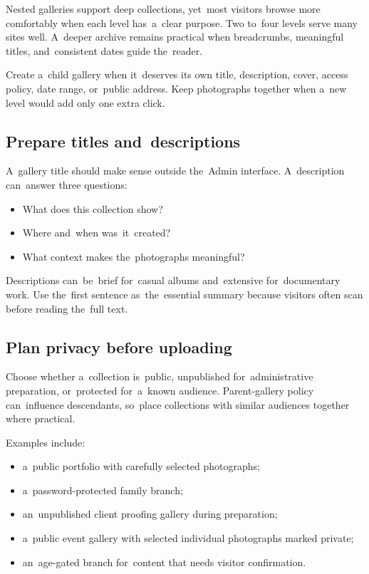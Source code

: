 \documentclass[11pt,a4paper]{article}
\begin{document}
Nested galleries support deep collections, yet~most visitors browse more
comfortably when each level has~a~clear purpose. Two to~four levels serve many
sites well. A~deeper archive remains practical when breadcrumbs, meaningful
titles, and~consistent dates guide the~reader.

Create a~child gallery when it~deserves its own title, description, cover,
access policy, date range, or~public address. Keep photographs together when
a~new level would add only one extra click.

\subsection{Prepare titles and~descriptions}

A~gallery title should make sense outside the~Admin interface. A~description
can~answer three questions:

\begin{itemize}
  \item What does this collection show?
  \item Where and~when was~it~created?
  \item What context makes the~photographs meaningful?
\end{itemize}

Descriptions can~be~brief for~casual albums and~extensive for~documentary work.
Use the~first sentence as~the~essential summary because visitors often scan
before reading the~full text.

\subsection{Plan privacy before uploading}

Choose whether a~collection is~public, unpublished for~administrative
preparation, or~protected for~a~known audience. Parent-gallery policy
can~influence descendants, so~place collections with similar audiences together
where practical.

Examples include:

\begin{itemize}
  \item a~public portfolio with carefully selected photographs;
  \item a~password-protected family branch;
  \item an~unpublished client proofing gallery during preparation;
  \item a~public event gallery with selected individual photographs marked
  private;
  \item an~age-gated branch for~content that needs visitor confirmation.
\end{itemize}
\end{document}
